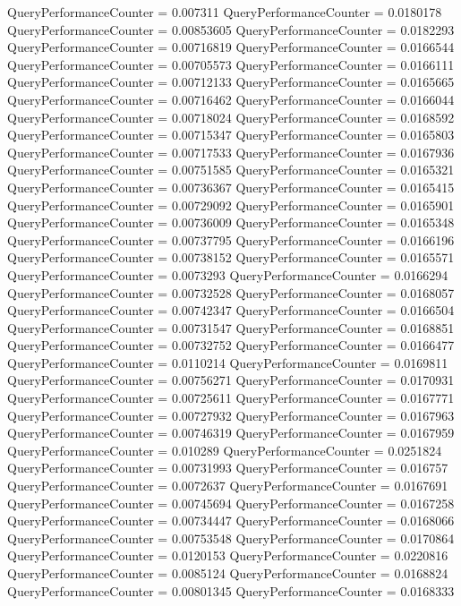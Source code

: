 \documentclass[9pt]{article}
\theoremstyle{plain}
\theoremstyle{definition}
\theoremstyle{remark}
\numberwithin{equation}{section}
\begin{document}
QueryPerformanceCounter  =  0.007311
QueryPerformanceCounter  =  0.0180178
QueryPerformanceCounter  =  0.00853605
QueryPerformanceCounter  =  0.0182293
QueryPerformanceCounter  =  0.00716819
QueryPerformanceCounter  =  0.0166544
QueryPerformanceCounter  =  0.00705573
QueryPerformanceCounter  =  0.0166111
QueryPerformanceCounter  =  0.00712133
QueryPerformanceCounter  =  0.0165665
QueryPerformanceCounter  =  0.00716462
QueryPerformanceCounter  =  0.0166044
QueryPerformanceCounter  =  0.00718024
QueryPerformanceCounter  =  0.0168592
QueryPerformanceCounter  =  0.00715347
QueryPerformanceCounter  =  0.0165803
QueryPerformanceCounter  =  0.00717533
QueryPerformanceCounter  =  0.0167936
QueryPerformanceCounter  =  0.00751585
QueryPerformanceCounter  =  0.0165321
QueryPerformanceCounter  =  0.00736367
QueryPerformanceCounter  =  0.0165415
QueryPerformanceCounter  =  0.00729092
QueryPerformanceCounter  =  0.0165901
QueryPerformanceCounter  =  0.00736009
QueryPerformanceCounter  =  0.0165348
QueryPerformanceCounter  =  0.00737795
QueryPerformanceCounter  =  0.0166196
QueryPerformanceCounter  =  0.00738152
QueryPerformanceCounter  =  0.0165571
QueryPerformanceCounter  =  0.0073293
QueryPerformanceCounter  =  0.0166294
QueryPerformanceCounter  =  0.00732528
QueryPerformanceCounter  =  0.0168057
QueryPerformanceCounter  =  0.00742347
QueryPerformanceCounter  =  0.0166504
QueryPerformanceCounter  =  0.00731547
QueryPerformanceCounter  =  0.0168851
QueryPerformanceCounter  =  0.00732752
QueryPerformanceCounter  =  0.0166477
QueryPerformanceCounter  =  0.0110214
QueryPerformanceCounter  =  0.0169811
QueryPerformanceCounter  =  0.00756271
QueryPerformanceCounter  =  0.0170931
QueryPerformanceCounter  =  0.00725611
QueryPerformanceCounter  =  0.0167771
QueryPerformanceCounter  =  0.00727932
QueryPerformanceCounter  =  0.0167963
QueryPerformanceCounter  =  0.00746319
QueryPerformanceCounter  =  0.0167959
QueryPerformanceCounter  =  0.010289
QueryPerformanceCounter  =  0.0251824
QueryPerformanceCounter  =  0.00731993
QueryPerformanceCounter  =  0.016757
QueryPerformanceCounter  =  0.0072637
QueryPerformanceCounter  =  0.0167691
QueryPerformanceCounter  =  0.00745694
QueryPerformanceCounter  =  0.0167258
QueryPerformanceCounter  =  0.00734447
QueryPerformanceCounter  =  0.0168066
QueryPerformanceCounter  =  0.00753548
QueryPerformanceCounter  =  0.0170864
QueryPerformanceCounter  =  0.0120153
QueryPerformanceCounter  =  0.0220816
QueryPerformanceCounter  =  0.0085124
QueryPerformanceCounter  =  0.0168824
QueryPerformanceCounter  =  0.00801345
QueryPerformanceCounter  =  0.0168333
\end{document}

